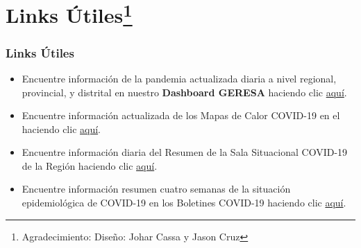 \documentclass[xcolor=table]{beamer}
\begin{document}
\section{Links Útiles\footnote{Agradecimiento: Diseño: Johar Cassa y Jason Cruz}}

\begin{frame}[label=links]
	\frametitle{Links Útiles}
	\vspace{-.5cm}
	\begin{itemize}
		\item Encuentre {\color{mycolor4} información de la pandemia actualizada diaria a nivel regional, provincial, y distrital} en nuestro {\color{mycolor4}\textbf{Dashboard GERESA}} haciendo clic \href{https://geresacusc.shinyapps.io/GERESA_dashboard/}{\color{mycolor2}aquí}.
		\item Encuentre información actualizada de los {\color{mycolor4}Mapas de Calor COVID-19} en el haciendo clic \href{http://www.diresacusco.gob.pe/diresa/}{\color{mycolor2}aquí}.
		\item Encuentre información diaria del {\color{mycolor4} Resumen de la Sala Situacional COVID-19} de la Región haciendo clic \href{https://app.powerbi.com/view?r=eyJrIjoiZDdiMzA4YWMtZTZmNC00ZWE2LWFmMmYtODkwZmM1ODhiYTljIiwidCI6IjM2NGE0NmEwLTk0YzctNGZkNi1iYTNjLTlmMmQzMjA5YzFlZiJ9}{\color{mycolor2}aquí}.
		\item Encuentre información resumen cuatro semanas de la situación epidemiológica de COVID-19 en los {\color{mycolor4}Boletines COVID-19} haciendo clic \href{https://sites.google.com/view/geresacusco/boletines-epidemiologicos-covid-19}{\color{mycolor2}aquí}. \hyperlink{indice}{}
	\end{itemize}

\end{frame}




\end{document}
